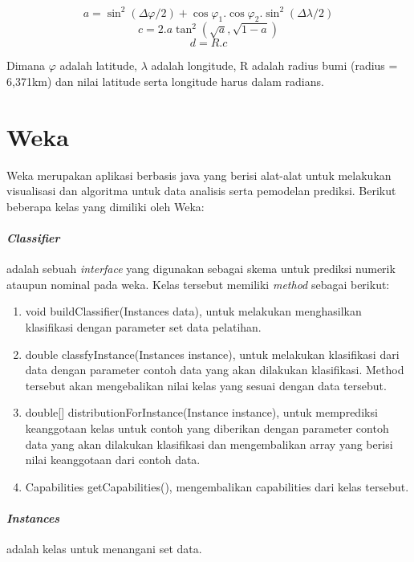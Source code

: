 \begin{displaymath}
	a = \sin^{2}(\Delta\varphi/2) + \cos\varphi_{1} . \cos\varphi_{2} . \sin^{2}(\Delta\lambda/2)
\end{displaymath}
\begin{displaymath}
	c = 2 . a\tan^{2}(\sqrt{a}, \sqrt{1-a})
\end{displaymath}
\begin{displaymath}
	d = R . c
\end{displaymath}

Dimana $\varphi$ adalah latitude, $\lambda$ adalah longitude, R adalah radius bumi (radius = 6,371km) dan nilai latitude serta longitude harus dalam radians.


\section{Weka}
Weka merupakan aplikasi berbasis java yang berisi alat-alat untuk melakukan visualisasi dan algoritma untuk data analisis serta pemodelan prediksi. Berikut beberapa kelas yang dimiliki oleh Weka:

\paragraph{\textsl{Classifier}} adalah sebuah \textsl{interface} yang digunakan sebagai skema untuk prediksi numerik ataupun nominal pada weka. Kelas tersebut memiliki \textsl{method} sebagai berikut:
\begin{enumerate}
	\item void buildClassifier(Instances data), untuk melakukan menghasilkan klasifikasi dengan parameter set data pelatihan.
	\item double classfyInstance(Instances instance), untuk melakukan klasifikasi dari data dengan parameter contoh data yang akan dilakukan klasifikasi. Method tersebut akan mengebalikan nilai kelas yang sesuai dengan data tersebut.
	\item double[] distributionForInstance(Instance instance), untuk memprediksi keanggotaan kelas untuk contoh yang diberikan dengan parameter contoh data yang akan dilakukan klasifikasi dan mengembalikan array yang berisi nilai keanggotaan dari contoh data.
	\item Capabilities getCapabilities(), mengembalikan capabilities dari kelas tersebut.
\end{enumerate}

\paragraph{\textsl{Instances}} adalah kelas untuk menangani set data.

